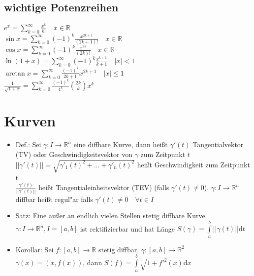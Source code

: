 \documentclass[10pt,a4paper^, twocolumn]{article}
\newcommand{\menge}{\mathbb} %
\renewcommand{\d}{\mathrm{d}} %
\newcommand{\R}{\mathbb{R}}
\begin{document}
\subsection{wichtige Potenzreihen}
	$e^x = \sum\limits_{k=0}^\infty \frac{x^k}{k!} \quad x \in \R$ \\
	$\sin x = \sum\limits_{k=0}^\infty (-1)^k \frac{x^{2k+1}}{(2k+1)!} \quad x \in \R$ \\
	$\cos x = \sum\limits_{k=0}^\infty (-1)^k \frac{x^{2k}}{(2k)!} \quad x \in \R$ \\
	$\ln (1+x) = \sum\limits_{k=0}^\infty (-1)^k \frac{x^{k+1}}{k+1} \quad |x| < 1$\\
	$\arctan x = \sum\limits_{k=0}^\infty \frac{(-1)^k}{2k+1} x^{2k+1} \quad |x| \leq 1$ \\
	$\frac{1}{\sqrt{1+x}} = \sum\limits_{k=0}^\infty \frac{(-1)^k}{4^k} \binom{2k}{k} x^k$



\section{Kurven}
	\begin{itemize}
	\item{Def.:} Sei $\gamma : I \rightarrow \menge{R}^n$ eine diffbare Kurve, 
		dann heißt $\gamma'(t)$ Tangentialvektor (TV) oder Geschwindigkeitsvektor von $\gamma$ zum Zeitpunkt $t$ \\
		$||\gamma'(t)|| = \sqrt{\gamma'_1(t)^2 + \dots + \gamma'_n(t)^2}$ heißt Geschwindigkeit zum Zeitpunkt t \\
		$\frac{\gamma'(t)}{||\gamma'(t)||}$ heißt Tangentialeinheitsvektor (TEV) (falls $\gamma'(t) \neq 0$).
		$\gamma: I \rightarrow \menge{R}^n$ diffbar heißt regul"ar falls $\gamma'(t) \neq 0 \quad \forall t \in I$
	\item{Satz:} Eine außer an endlich vielen Stellen stetig diffbare Kurve $\gamma: I \rightarrow \menge{R}^n, I=[a,b]$ ist rektifizierbar und hat Länge
		$S(\gamma) = \int\limits_a^b || \gamma(t) || \d t$
	\item{Korollar:} Sei $f:[a,b] \rightarrow \menge{R}$ stetig diffbar, $\gamma:[a,b] \rightarrow \menge{R}^2$ \\
		$\gamma(x) = (x, f(x))$, 
		dann $S(f) = \int\limits_a^b\sqrt{1+f'^2(x)} \d x $
	\end{itemize}
\end{document}
